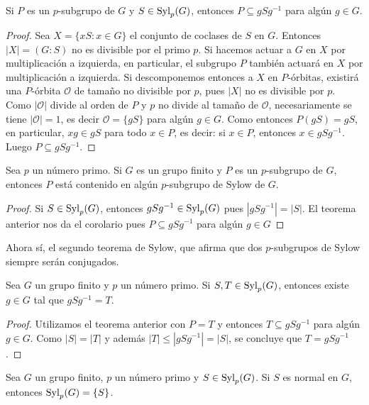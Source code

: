 \begin{theorem}
Si $P$ es un $p$-subgrupo de $G$ y $S\in\mathrm{Syl}_p(G)$, entonces $P\subseteq gSg^{-1}$ para algún $g\in G$.	
\end{theorem}

\begin{proof}
	Sea $X=\{xS:x\in G\}$ el conjunto de coclases de $S$ en $G$. Entonces $|X|=(G:S)$ no es divisible por el primo $p$. Si hacemos actuar a $G$ en $X$ por multiplicación a izquierda, en particular, el subgrupo $P$ también actuará en $X$ por multiplicación a izquierda. Si descomponemos entonces a $X$ en $P$-órbitas, existirá una $P$-órbita $\mathcal{O}$ de tamaño 
	no divisible por $p$, pues $|X|$ no es divisible por $p$. Como $|\mathcal{O}|$ divide al orden de $P$ y $p$ no divide al tamaño de $\mathcal{O}$, necesariamente se tiene $|\mathcal{O}|=1$, 
	es decir $\mathcal{O}=\{gS\}$ para algún $g\in G$. Como entonces $P(gS)=gS$, en particular, $xg\in gS$ para todo $x\in P$, es decir: si $x\in P$, entonces $x\in gSg^{-1}$. Luego $P\subseteq gSg^{-1}$. 
\end{proof}

\begin{corollary}
	Sea $p$ un número primo. 
	Si $G$ es un grupo finito y $P$ es un $p$-subgrupo de $G$, entonces $P$ está contenido en algún $p$-subgrupo de Sylow de $G$.
\end{corollary}

\begin{proof}
Si $S\in\mathrm{Syl}_p(G)$, entonces $gSg^{-1}\in\mathrm{Syl}_p(G)$ pues $|gSg^{-1}|=|S|$. El teorema anterior nos da el corolario pues $P\subseteq gSg^{-1}$ para algún $g\in G$  	
\end{proof}

Ahora sí, el segundo teorema de Sylow, que afirma que dos $p$-subgrupos de Sylow siempre serán conjugados.

\begin{theorem}
Sea $G$ un grupo finito y $p$ un número primo. 
Si $S,T\in\mathrm{Syl}_p(G)$, entonces existe $g\in G$ tal que $gSg^{-1}=T$. 
\end{theorem}

\begin{proof}
Utilizamos el teorema anterior con $P=T$ y entonces $T\subseteq gSg^{-1}$ para algún $g\in G$. Como $|S|=|T|$ y además  
$|T|\leq |gSg^{-1}|=|S|$, se concluye que $T=gSg^{-1}$.  	
\end{proof}

\begin{corollary}
Sea $G$ un grupo finito, $p$ un número primo y $S\in\mathrm{Syl}_p(G)$. Si $S$ es normal en $G$, entonces $\mathrm{Syl}_p(G)=\{S\}$. 
\end{corollary}

